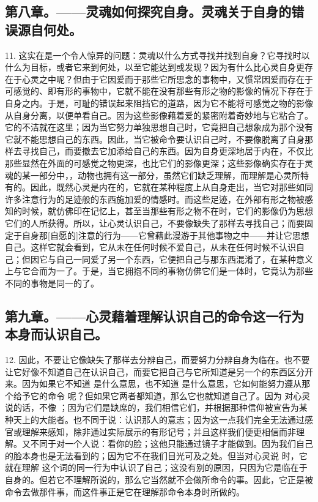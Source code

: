 
\subsection{第八章。——灵魂如何探究自身。灵魂关于自身的错误源自何处。}

11. 这实在是一个令人惊异的问题：灵魂以什么方式寻找并找到自身？它寻找时以什么为目标，或者它来到何处，以至它能达到或发现？因为有什么比心灵自身更存在于心灵之中呢？但由于它因爱而于那些它所思念的事物中，又惯常因爱而存在于可感觉的、即有形的事物中，它就不能在没有那些有形之物的影像的情况下存在于自身之内。于是，可耻的错误起来阻挡它的道路，因为它不能将可感觉之物的影像从自身分离，以便单看自己。因为这些影像藉着爱的紧密附着奇妙地与它粘合了。它的不洁就在这里；因为当它努力单独思想自己时，它竟把自己想象成为那个没有它就不能思想自己的东西。因此，当它被命令要认识自己时，不要像脱离了自身那样去寻找自己，而要撤去它加添给自己的东西。因为自身更深地居于内在，不仅比那些显然在外面的可感觉之物更深，也比它们的影像更深；这些影像确实存在于灵魂的某一部分中，，动物也拥有这一部分，虽然它们缺乏理解，而理解是心灵所特有的。因此，既然心灵是内在的，它就在某种程度上从自身走出，当它对那些如同许多注意行为的足迹般的东西施加爱的情感时。而这些足迹，在外部有形之物被感知的时候，就仿佛印在记忆上，甚至当那些有形之物不在时，它们的影像仍为思想它们的人所获得。所以，让心灵认识自己，不要像缺失了那样去寻找自己；而要固定于自身那[自愿的]注意的行为——它曾藉此漫游于其他事物之中——并让它思想自己。这样它就会看到，它从未在任何时候不爱自己，从未在任何时候不认识自己；但因它与自己一同爱了另一个东西，它便把自己与那东西混淆了，在某种意义上与它合而为一了。于是，当它拥抱不同的事物仿佛它们是一体时，它竟认为那些不同的事物是同一的了。\par


\subsection{第九章。——心灵藉着理解认识自己的命令这一行为本身而认识自己。}

12. 因此，不要让它像缺失了那样去分辨自己，而要努力分辨自身为临在。也不要让它好像不知道自己在认识自己，而要它把自己与它所知道是另一个的东西区分开来。因为如果它不知道  是什么意思，也不知道  是什么意思，它如何能努力遵从那个给予它的命令  呢？但如果它两者都知道，那么它也就知道自己了。因为  对心灵说的话，不像 ；因为它们是缺席的，我们相信它们，并根据那种信仰被宣告为某种天上的大能者。也不同于说：认识那人的意志；因为这一点我们完全无法通过感官或理解来感知，除非通过实际展示的有形记号；并且这样我们便更相信而非理解。又不同于对一个人说：看你的脸；这他只能通过镜子才能做到。因为我们自己的脸本身也是无法看到的；因为它不在我们目光可及之处。但当对心灵说  时，它就在理解  这个词的同一行为中认识了自己；这没有别的原因，只因为它是临在于自身的。但若它不理解所说的，那么它当然就不会做所命令的事。因此，它正是被命令去做那件事，而这件事正是它在理解那命令本身时所做的。\par

